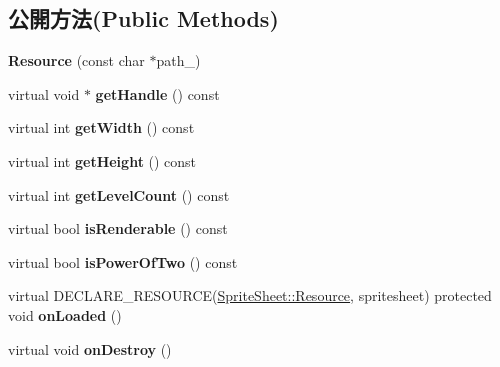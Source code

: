 \subsection*{公開方法(Public Methods)}
\begin{DoxyCompactItemize}
\item 
{\bfseries Resource} (const char $\ast$path\+\_\+)\hypertarget{class_magnum_1_1_sprite_sheet_1_1_resource_a7a68ee5cc7fdaf0a7221069007cc66af}{}\label{class_magnum_1_1_sprite_sheet_1_1_resource_a7a68ee5cc7fdaf0a7221069007cc66af}

\item 
virtual void $\ast$ {\bfseries get\+Handle} () const \hypertarget{class_magnum_1_1_sprite_sheet_1_1_resource_a70906b601ea74555144ea216c0160f6c}{}\label{class_magnum_1_1_sprite_sheet_1_1_resource_a70906b601ea74555144ea216c0160f6c}

\item 
virtual int {\bfseries get\+Width} () const \hypertarget{class_magnum_1_1_sprite_sheet_1_1_resource_ac698d665148bbdd92d218e709a5c1577}{}\label{class_magnum_1_1_sprite_sheet_1_1_resource_ac698d665148bbdd92d218e709a5c1577}

\item 
virtual int {\bfseries get\+Height} () const \hypertarget{class_magnum_1_1_sprite_sheet_1_1_resource_a16bc87e3e568a06f22a87feb02963457}{}\label{class_magnum_1_1_sprite_sheet_1_1_resource_a16bc87e3e568a06f22a87feb02963457}

\item 
virtual int {\bfseries get\+Level\+Count} () const \hypertarget{class_magnum_1_1_sprite_sheet_1_1_resource_a3c5984e95d8cf7f6d266a0aac7bceed2}{}\label{class_magnum_1_1_sprite_sheet_1_1_resource_a3c5984e95d8cf7f6d266a0aac7bceed2}

\item 
virtual bool {\bfseries is\+Renderable} () const \hypertarget{class_magnum_1_1_sprite_sheet_1_1_resource_a99552de3093e6bc65c9bf3b9ae58218f}{}\label{class_magnum_1_1_sprite_sheet_1_1_resource_a99552de3093e6bc65c9bf3b9ae58218f}

\item 
virtual bool {\bfseries is\+Power\+Of\+Two} () const \hypertarget{class_magnum_1_1_sprite_sheet_1_1_resource_a11cc9b6fcdba1a9a37ca3ed54d7c386c}{}\label{class_magnum_1_1_sprite_sheet_1_1_resource_a11cc9b6fcdba1a9a37ca3ed54d7c386c}

\item 
virtual D\+E\+C\+L\+A\+R\+E\+\_\+\+R\+E\+S\+O\+U\+R\+CE(\hyperlink{class_magnum_1_1_sprite_sheet_1_1_resource}{Sprite\+Sheet\+::\+Resource}, spritesheet) protected void {\bfseries on\+Loaded} ()\hypertarget{class_magnum_1_1_sprite_sheet_1_1_resource_a59b2d75ccef2ac848755c67c3321218b}{}\label{class_magnum_1_1_sprite_sheet_1_1_resource_a59b2d75ccef2ac848755c67c3321218b}

\item 
virtual void {\bfseries on\+Destroy} ()\hypertarget{class_magnum_1_1_sprite_sheet_1_1_resource_a1ab8f27edf3146dc0ad0a4d1237bb87c}{}\label{class_magnum_1_1_sprite_sheet_1_1_resource_a1ab8f27edf3146dc0ad0a4d1237bb87c}

\end{DoxyCompactItemize}
